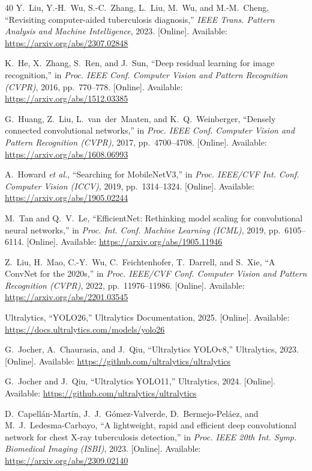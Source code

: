\documentclass[conference, letterpaper]{IEEEtran}
\begin{document}
\begin{thebibliography}{40}
Y.~Liu, Y.-H.~Wu, S.-C.~Zhang, L.~Liu, M.~Wu, and M.-M.~Cheng, ``Revisiting computer-aided tuberculosis diagnosis,'' \textit{IEEE Trans. Pattern Analysis and Machine Intelligence}, 2023. [Online]. Available: \url{https://arxiv.org/abs/2307.02848}

K.~He, X.~Zhang, S.~Ren, and J.~Sun, ``Deep residual learning for image recognition,'' in \textit{Proc. IEEE Conf. Computer Vision and Pattern Recognition (CVPR)}, 2016, pp.~770--778. [Online]. Available: \url{https://arxiv.org/abs/1512.03385}

G.~Huang, Z.~Liu, L.~van~der~Maaten, and K.~Q.~Weinberger, ``Densely connected convolutional networks,'' in \textit{Proc. IEEE Conf. Computer Vision and Pattern Recognition (CVPR)}, 2017, pp.~4700--4708. [Online]. Available: \url{https://arxiv.org/abs/1608.06993}

A.~Howard \textit{et al.}, ``Searching for MobileNetV3,'' in \textit{Proc. IEEE/CVF Int. Conf. Computer Vision (ICCV)}, 2019, pp.~1314--1324. [Online]. Available: \url{https://arxiv.org/abs/1905.02244}

M.~Tan and Q.~V.~Le, ``EfficientNet: Rethinking model scaling for convolutional neural networks,'' in \textit{Proc. Int. Conf. Machine Learning (ICML)}, 2019, pp.~6105--6114. [Online]. Available: \url{https://arxiv.org/abs/1905.11946}

Z.~Liu, H.~Mao, C.-Y.~Wu, C.~Feichtenhofer, T.~Darrell, and S.~Xie, ``A ConvNet for the 2020s,'' in \textit{Proc. IEEE/CVF Conf. Computer Vision and Pattern Recognition (CVPR)}, 2022, pp.~11976--11986. [Online]. Available: \url{https://arxiv.org/abs/2201.03545}

Ultralytics, ``YOLO26,'' Ultralytics Documentation, 2025. [Online]. Available: \url{https://docs.ultralytics.com/models/yolo26}

G.~Jocher, A.~Chaurasia, and J.~Qiu, ``Ultralytics YOLOv8,'' Ultralytics, 2023. [Online]. Available: \url{https://github.com/ultralytics/ultralytics}

G.~Jocher and J.~Qiu, ``Ultralytics YOLO11,'' Ultralytics, 2024. [Online]. Available: \url{https://github.com/ultralytics/ultralytics}

D.~Capell\'{a}n-Mart\'{i}n, J.~J.~G\'{o}mez-Valverde, D.~Bermejo-Pel\'{a}ez, and M.~J.~Ledesma-Carbayo, ``A lightweight, rapid and efficient deep convolutional network for chest X-ray tuberculosis detection,'' in \textit{Proc. IEEE 20th Int. Symp. Biomedical Imaging (ISBI)}, 2023. [Online]. Available: \url{https://arxiv.org/abs/2309.02140}


\end{thebibliography}
\end{document}
